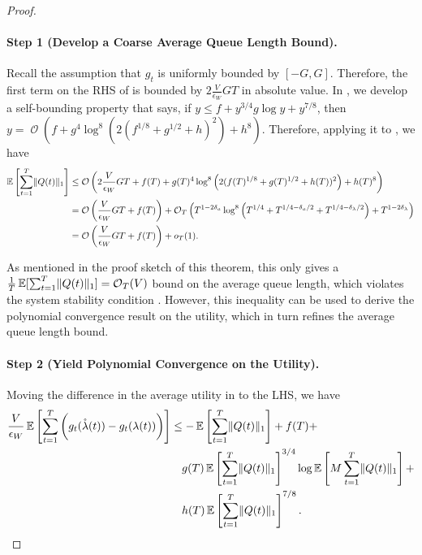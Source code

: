 \documentclass[11pt,fullpage,letterpaper]{article} %
\renewcommand{\bm}[1]{#1}%
\renewcommand{\O}{\operatorname{\mathcal O}}
\newcommand{\E}{\operatornamewithlimits{\mathbb{E}}}
\begin{document}
\begin{proof}
\paragraph{Step 1 (Develop a Coarse Average Queue Length Bound).}
Recall the assumption that $g_t$ is uniformly bounded by $[-G,G]$. Therefore, the first term on the RHS of  is bounded by $2\frac{V}{\epsilon_W} GT$ in absolute value.
In , we develop a self-bounding property that says, if $y\le f+y^{3/4} g \log y +y^{7/8}$, then $y=\O\left (f+g^4 \log^8\left (2(f^{1/8}+g^{1/2}+h)^2\right )+h^8\right )$.
Therefore, applying it to , we have
\begin{align}
\E\left [\sum_{t=1}^T \lVert \bm Q(t)\rVert_1\right ]&\le \O\left (2\frac{V}{\epsilon_W} GT + f(T) + g(T)^4 \log^8\left (2(f(T)^{1/8}+g(T)^{1/2}+h(T))^2\right ) + h(T)^8\right ) \nonumber\\
&=\O\left (\frac{V}{\epsilon_W} GT + f(T)\right ) + \O_T\left (T^{1-2\delta_a} \log^8 \left (T^{1/4} + T^{1/4-\delta_a/2} + T^{1/4-\delta_\lambda/2}\right ) + T^{1-2\delta_\lambda}\right ) \nonumber\\
&=\O\left (\frac{V}{\epsilon_W} GT + f(T)\right )+o_T(1). \label{eq:coarse queue length bound}
\end{align}

As mentioned in the proof sketch of this theorem, this only gives a $\frac 1T\E[\sum_{t=1}^T \lVert \bm Q(t)\rVert_1]=\O_T(V)$ bound on the average queue length, which violates the system stability condition . However, this inequality can be used to derive the polynomial convergence result on the utility, which in turn refines the average queue length bound.

\paragraph{Step 2 (Yield Polynomial Convergence on the Utility).}
Moving the difference in the average utility in  to the LHS, we have
\begin{align*}
\frac{V}{\epsilon_W} \E\left [\sum_{t=1}^T \bigg (g_t(\mathring{\bm \lambda}(t)) - g_t(\bm \lambda(t))\bigg )\right ]&\le -\E\left [\sum_{t=1}^T \lVert \bm Q(t)\rVert_1\right ] + f(T) + \nonumber \\
&\quad g(T) \E\left [\sum_{t=1}^T \lVert \bm Q(t)\rVert_1\right ]^{3/4} \log \E\left [M \sum_{t=1}^T \lVert \bm Q(t)\rVert_1\right ] + \nonumber \\
&\quad h(T) \E\left [\sum_{t=1}^T \lVert \bm Q(t)\rVert_1\right ]^{7/8}.
\end{align*}


\end{proof}
\end{document}
